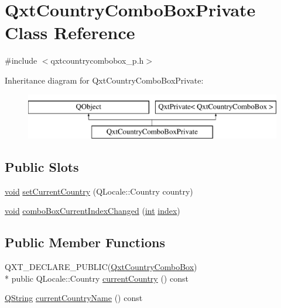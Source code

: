 \hypertarget{class_qxt_country_combo_box_private}{\section{Qxt\-Country\-Combo\-Box\-Private Class Reference}
\label{class_qxt_country_combo_box_private}
}


{\ttfamily \#include $<$qxtcountrycombobox\-\_\-p.\-h$>$}

Inheritance diagram for Qxt\-Country\-Combo\-Box\-Private\-:\begin{figure}[H]
\begin{center}
\leavevmode
\includegraphics[height=2.000000cm]{class_qxt_country_combo_box_private}
\end{center}
\end{figure}
\subsection*{Public Slots}
\begin{DoxyCompactItemize}
\item 
\hyperlink{group___u_a_v_objects_plugin_ga444cf2ff3f0ecbe028adce838d373f5c}{void} \hyperlink{class_qxt_country_combo_box_private_a41d0b30ad4c3c896b971a8ed998fdda7}{set\-Current\-Country} (Q\-Locale\-::\-Country country)
\item 
\hyperlink{group___u_a_v_objects_plugin_ga444cf2ff3f0ecbe028adce838d373f5c}{void} \hyperlink{class_qxt_country_combo_box_private_ab4dbc72d8dc9b00d098239681eb7c93d}{combo\-Box\-Current\-Index\-Changed} (\hyperlink{ioapi_8h_a787fa3cf048117ba7123753c1e74fcd6}{int} \hyperlink{glext_8h_ab47dd9958bcadea08866b42bf358e95e}{index})
\end{DoxyCompactItemize}
\subsection*{Public Member Functions}
\begin{DoxyCompactItemize}
\item 
Q\-X\-T\-\_\-\-D\-E\-C\-L\-A\-R\-E\-\_\-\-P\-U\-B\-L\-I\-C(\hyperlink{class_qxt_country_combo_box}{Qxt\-Country\-Combo\-Box}) \\*
public Q\-Locale\-::\-Country \hyperlink{class_qxt_country_combo_box_private_a0e162b35dd3b9c1d1673cab01df9c269}{current\-Country} () const 
\item 
\hyperlink{group___u_a_v_objects_plugin_gab9d252f49c333c94a72f97ce3105a32d}{Q\-String} \hyperlink{class_qxt_country_combo_box_private_a023b7876aec617b0a5a7926cb2be3cd5}{current\-Country\-Name} () const 
\end{DoxyCompactItemize}
